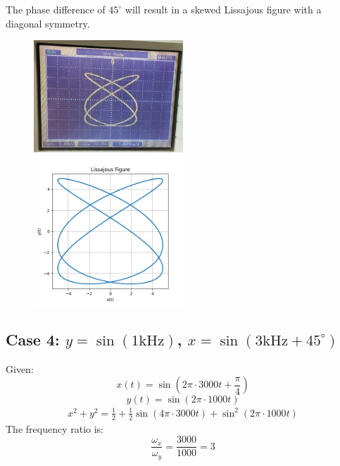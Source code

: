 \documentclass{article}
\begin{document}
The phase difference of \( 45^\circ \) will result in a skewed Lissajous figure with a diagonal symmetry.
\begin{figure}[H]
\centering
\includegraphics[width=0.5\textwidth]{figs/fig3.png}
\includegraphics[width=0.5\textwidth]{figs/fig3_verify.png}
\end{figure}
\subsection{Case 4: $y = \sin(1\text{kHz})$, $x = \sin(3\text{kHz} + 45^\circ)$}

Given:
\[
x(t) = \sin(2\pi \cdot 3000 t + \frac{\pi}{4})
\]
\[
y(t) = \sin(2\pi \cdot 1000 t)
\]
\begin{align*}
x^2 + y^2 = \frac{1}{2} + \frac{1}{2} \sin\left( 4\pi \cdot 3000 t \right) + \sin^2\left( 2\pi \cdot 1000 t \right)
\end{align*}
The frequency ratio is:
\[
\frac{\omega_x}{\omega_y} = \frac{3000}{1000} = 3
\]
\end{document}
